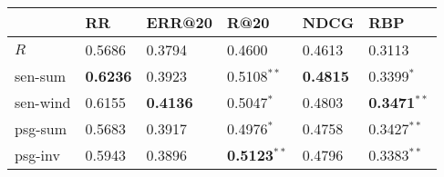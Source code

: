 \begin{tabular}{llllll}
\toprule
{} &               RR &           ERR@20 &                    R@20 &             NDCG &                     RBP \\
\midrule
$R$      &           0.5686 &           0.3794 &                  0.4600 &           0.4613 &                  0.3113 \\
sen-sum  &  \textbf{0.6236} &           0.3923 &           0.5108$^{**}$ &  \textbf{0.4815} &            0.3399$^{*}$ \\
sen-wind &           0.6155 &  \textbf{0.4136} &            0.5047$^{*}$ &           0.4803 &  \textbf{0.3471}$^{**}$ \\
psg-sum  &           0.5683 &           0.3917 &            0.4976$^{*}$ &           0.4758 &           0.3427$^{**}$ \\
psg-inv  &           0.5943 &           0.3896 &  \textbf{0.5123}$^{**}$ &           0.4796 &           0.3383$^{**}$ \\
\bottomrule
\end{tabular}
